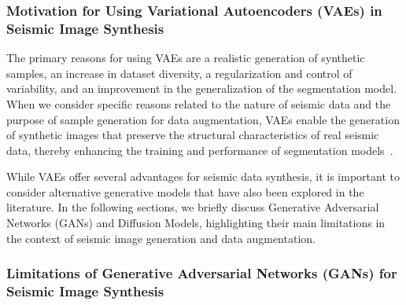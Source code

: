 \documentclass{ieeeaccess}
\begin{document}
\subsubsection{Motivation for Using Variational Autoencoders (VAEs) in Seismic Image Synthesis}

The primary reasons for using VAEs are a realistic generation of synthetic samples, an increase in dataset diversity, a regularization and control of variability, and an improvement in the generalization of the segmentation model. When we consider specific reasons related to the nature of seismic data and the purpose of sample generation for data augmentation, VAEs enable the generation of synthetic images that preserve the structural characteristics of real seismic data, thereby enhancing the training and performance of segmentation models~\cite{Henriques2021,Wang2021,Anjom2024}.

While VAEs offer several advantages for seismic data synthesis, it is important to consider alternative generative models that have also been explored in the literature. In the following sections, we briefly discuss Generative Adversarial Networks (GANs) and Diffusion Models, highlighting their main limitations in the context of seismic image generation and data augmentation.

\subsubsection{Limitations of Generative Adversarial Networks (GANs) for Seismic Image Synthesis}
\end{document}

